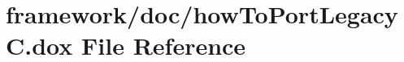 \hypertarget{how_to_port_legacy_c_8dox}{}\section{framework/doc/how\+To\+Port\+LegacyC.dox File Reference}
\label{how_to_port_legacy_c_8dox}
